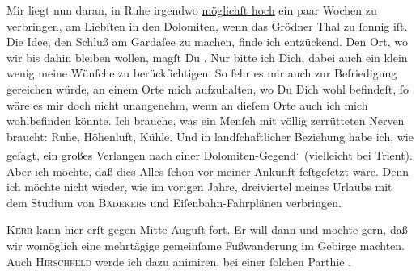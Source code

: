 \pstart
           Mir liegt nun daran, in Ruhe irgendwo \uline{möglichſt hoch}
               ein paar Wochen zu verbringen, am Liebſten in den Dolomiten, wenn das Grödner Thal zu
               ſonnig iſt. Die Idee, den Schluß am Gardaſee zu
               machen, finde ich entzückend. Den Ort, wo wir bis dahin bleiben wollen, magſt Du
                  \label{K_L03073-3v}\label{K_L03073-3}. Nur bitte ich Dich, dabei auch ein klein wenig meine Wünſche zu
               berückſichtigen. So ſehr {\pb}es mir auch zur Befriedigung
               gereichen würde, an einem Orte mich aufzuhalten, wo Du Dich wohl befindeſt, ſo wäre
               es mir doch nicht \strikeout{\textcolor{gray}{×}} unangenehm, wenn an dieſem Orte auch ich mich wohlbefinden könnte. Ich
               brauche, was ein Menſch mit völlig zerrütteten Nerven braucht: Ruhe, Höhenluft,
               Kühle. Und in landſchaftlicher Beziehung habe ich, wie geſagt, ein großes  Verlangen nach einer Dolomiten-Gegend\substVorne{}\textsuperscript{.}\substDazwischen{} (\substHinten{}vielleicht bei Trient). Aber ich möchte,
               daß dies Alles ſchon vor meiner Ankunft {\pb}feſtgeſetzt
               wäre. Denn ich möchte nicht wieder, wie im vorigen Jahre,
               dreiviertel meines Urlaubs mit dem Studium von \textsc{Bädekers} und Eiſenbahn-Fahrplänen verbringen.\pend
           
\pstart
           \textsc{Kerr} kann hier erſt gegen Mitte Auguſt fort. Er will
               dann \label{K_L03073-4v}\label{K_L03073-4} und möchte gern, daß
               wir womöglich eine mehrtägige gemeinſame Fußwanderung im Gebirge machten. Auch \textsc{Hirschfeld}{ }{\pb}werde ich dazu animiren, bei einer ſolchen Parthie
                  \label{K_L03073-5v}\label{K_L03073-5}.\pend
           
